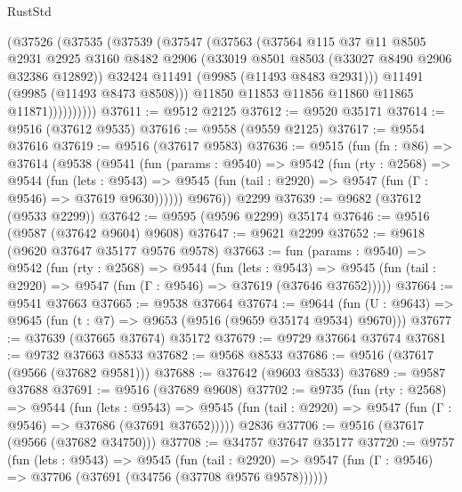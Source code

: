 \begin{lexlean}{RustStd}
\begin{coremodule}
                (@37526
                  (@37535
                    (@37539
                      (@37547
                        (@37563
                          (@37564
                            @115
                            @37
                            @11
                            @8505
                            @2931
                            @2925
                            @3160
                            @8482
                            @2906
                            (@33019 @8501 @8503 (@33027 @8490 @2906 @32386 @12892))
                            @32424
                            @11491
                            (@9985 (@11493 @8483 @2931)))
                          @11491
                          (@9985 (@11493 @8473 @8508)))
                        @11850
                        @11853
                        @11856
                        @11860
                        @11865
                        @11871))))))))))
@37611 := @9512 @2125
@37612 := @9520 @35171
@37614 := @9516 (@37612 @9535)
@37616 := @9558 (@9559 @2125)
@37617 := @9554 @37616
@37619 := @9516 (@37617 @9583)
@37636 := @9515
    (fun (fn : @86) =>
    @37614
      (@9538
        (@9541
          (fun (params : @9540) =>
          @9542
            (fun (rty : @2568) =>
            @9544
              (fun (lets : @9543) =>
              @9545 (fun (tail : @2920) => @9547 (fun (Γ : @9546) => @37619 @9630))))))
        @9676))
    @2299
@37639 := @9682 (@37612 (@9533 @2299))
@37642 := @9595 (@9596 @2299) @35174
@37646 := @9516 (@9587 (@37642 @9604) @9608)
@37647 := @9621 @2299
@37652 := @9618 (@9620 @37647 @35177 @9576 @9578)
@37663 := fun (params : @9540) =>
  @9542
    (fun (rty : @2568) =>
    @9544
      (fun (lets : @9543) =>
      @9545 (fun (tail : @2920) => @9547 (fun (Γ : @9546) => @37619 (@37646 @37652)))))
@37664 := @9541 @37663
@37665 := @9538 @37664
@37674 := @9644
    (fun (U : @9643) => @9645 (fun (t : @7) => @9653 (@9516 (@9659 @35174 @9534) @9670)))
@37677 := @37639 (@37665 @37674) @35172
@37679 := @9729 @37664 @37674
@37681 := @9732 @37663 @8533
@37682 := @9568 @8533
@37686 := @9516 (@37617 (@9566 (@37682 @9581)))
@37688 := @37642 (@9603 @8533)
@37689 := @9587 @37688
@37691 := @9516 (@37689 @9608)
@37702 := @9735
    (fun (rty : @2568) =>
    @9544
      (fun (lets : @9543) =>
      @9545 (fun (tail : @2920) => @9547 (fun (Γ : @9546) => @37686 (@37691 @37652)))))
    @2836
@37706 := @9516 (@37617 (@9566 (@37682 @34750)))
@37708 := @34757 @37647 @35177
@37720 := @9757
    (fun (lets : @9543) =>
    @9545
      (fun (tail : @2920) =>
      @9547 (fun (Γ : @9546) => @37706 (@37691 (@34756 (@37708 @9576 @9578))))))

\end{coremodule}
\end{lexlean}
